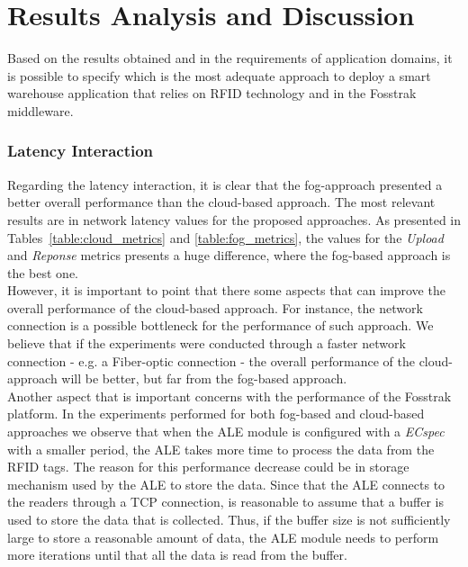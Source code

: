 \section{Results Analysis and Discussion}
\label{sec:eval_analysis}
Based on the results obtained and in the requirements of application domains, it is possible to specify
which is the most adequate approach to deploy a smart warehouse application that relies on \gls{RFID}
technology and in the Fosstrak middleware.

\subsubsection{Latency Interaction}
\label{subs:eval_results_latency}
Regarding the latency interaction, it is clear that the fog-approach presented a better overall
performance than the cloud-based approach. The most relevant results are in network latency values
for the proposed approaches. As presented in Tables~\ref{table:cloud_metrics} and \ref{table:fog_metrics},
the values for the \textit{Upload} and \textit{Reponse} metrics presents a huge difference, where
the fog-based approach is the best one.\\

However, it is important to point that there some aspects that can improve the overall performance
of the cloud-based approach. For instance, the network connection is a possible bottleneck for the
performance of such approach. We believe that if the experiments were conducted through a faster
network connection - e.g. a Fiber-optic connection - the overall performance of the cloud-approach
will be better, but far from the fog-based approach.\\

Another aspect that is important concerns with the performance of the Fosstrak platform.
In the experiments performed for both fog-based and cloud-based approaches we observe that when
the \gls{ALE} module is configured with a \textit{ECspec} with a smaller period, the \gls{ALE} takes
more time to process the data from the \gls{RFID} tags. The reason for this performance decrease
could be in storage mechanism used by the \gls{ALE} to store the data. Since that the \gls{ALE}
connects to the readers through a \gls{TCP} connection, is reasonable to assume that a buffer is
used to store the data that is collected. Thus, if the buffer size is not sufficiently large to store
a reasonable amount of data, the \gls{ALE} module needs to perform more iterations until that all the
data is read from the buffer.\\

